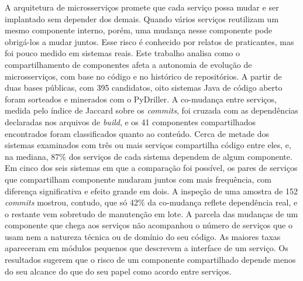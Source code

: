 A arquitetura de microsserviços promete que cada serviço possa mudar e ser implantado sem depender dos demais. Quando vários serviços reutilizam um mesmo componente interno, porém, uma mudança nesse componente pode obrigá-los a mudar juntos. Esse risco é conhecido por relatos de praticantes, mas foi pouco medido em sistemas reais. Este trabalho analisa como o compartilhamento de componentes afeta a autonomia de evolução de microsserviços, com base no código e no histórico de repositórios. A partir de duas bases públicas, com 395 candidatos, oito sistemas Java de código aberto foram sorteados e minerados com o PyDriller. A co-mudança entre serviços, medida pelo índice de Jaccard sobre os \textit{commits}, foi cruzada com as dependências declaradas nos arquivos de \textit{build}, e os 41 componentes compartilhados encontrados foram classificados quanto ao conteúdo. Cerca de metade dos sistemas examinados com três ou mais serviços compartilha código entre eles, e, na mediana, 87\% dos serviços de cada sistema dependem de algum componente. Em cinco dos seis sistemas em que a comparação foi possível, os pares de serviços que compartilham componente mudaram juntos com mais frequência, com diferença significativa e efeito grande em dois. A inspeção de uma amostra de 152 \textit{commits} mostrou, contudo, que só 42\% da co-mudança reflete dependência real, e o restante vem sobretudo de manutenção em lote. A parcela das mudanças de um componente que chega aos serviços não acompanhou o número de serviços que o usam nem a natureza técnica ou de domínio do seu código. As maiores taxas apareceram em módulos pequenos que descrevem a interface de um serviço. Os resultados sugerem que o risco de um componente compartilhado depende menos do seu alcance do que do seu papel como acordo entre serviços.

